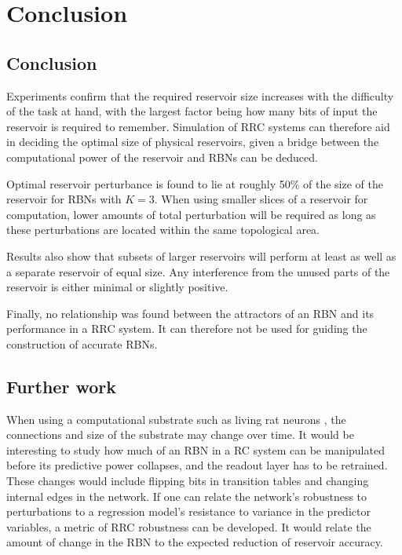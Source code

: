 \chapter{Conclusion}
\label{chapter:conclusion}

\section{Conclusion}

Experiments confirm that the required reservoir size increases with the difficulty of the task at hand,
with the largest factor being how many bits of input the reservoir is required to remember.
Simulation of RRC systems can therefore aid in deciding the optimal size of physical reservoirs,
given a bridge between the computational power of the reservoir and RBNs can be deduced.

Optimal reservoir perturbance is found to lie at roughly 50\% of the size of the reservoir for RBNs with $K=3$.
When using smaller slices of a reservoir for computation,
lower amounts of total perturbation will be required as long as these perturbations are located within the same topological area.

Results also show that subsets of larger reservoirs will perform at least as well as a separate reservoir of equal size.
Any interference from the unused parts of the reservoir is either minimal or slightly positive.

Finally, no relationship was found between the attractors of an RBN and its performance in a RRC system.
It can therefore not be used for guiding the construction of accurate RBNs.

\section{Further work}

When using a computational substrate such as living rat neurons \cite{demarse2005adaptive},
the connections and size of the substrate may change over time.
It would be interesting to study how much of an RBN in a RC system can be manipulated before its predictive power collapses,
and the readout layer has to be retrained.
These changes would include flipping bits in transition tables and changing internal edges in the network.
If one can relate the network's robustness to perturbations to a regression model's resistance to variance in the predictor variables,
a metric of RRC robustness can be developed.
It would relate the amount of change in the RBN to the expected reduction of reservoir accuracy.

